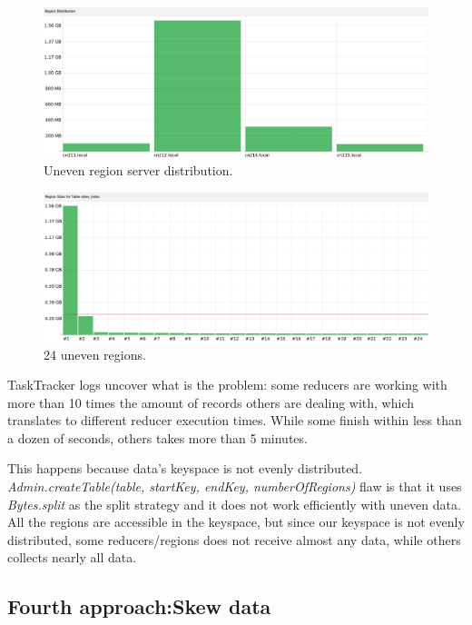 \begin{figure}[htb]
\centering
\includegraphics[width=1\textwidth,height=0.31\textheight]{./images/regiondistribution1.png}
\caption{Uneven region server distribution.} \label{fig:regionDistribution}
\end{figure}



\begin{figure}[htb]
\centering
\includegraphics[width=1\textwidth,height=0.31\textheight]{./images/24regions1.png}
\caption{24 uneven regions.} \label{fig:24evenRegions}
\end{figure}

TaskTracker logs uncover what is the problem: some reducers are working with more than 10 times the amount of records others are dealing with, which translates to different reducer execution times. While some finish within less than a dozen of seconds, others takes more than 5 minutes. 
\par
This happens because data's keyspace is not evenly distributed. \textit{Admin.createTable(table, startKey, endKey, numberOfRegions)} flaw is that it uses \textit{Bytes.split} as the split strategy and it does not work efficiently with uneven data. All the regions are accessible in the keyspace, but since our keyspace is not evenly distributed, some reducers/regions does not receive almost any data, while others collects nearly all data.



\subsection{Fourth approach:Skew data}

